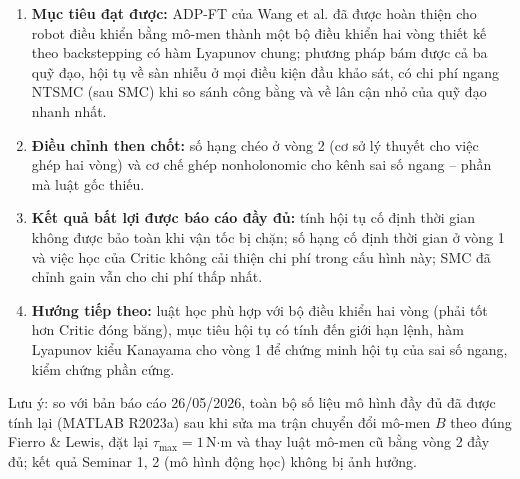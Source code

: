 \documentclass[12pt,a4paper]{article}
\begin{document}
\begin{enumerate}
    \item \textbf{Mục tiêu đạt được:} ADP-FT của Wang et al. đã được hoàn thiện cho robot điều khiển bằng mô-men thành một bộ điều khiển hai vòng thiết kế theo backstepping có hàm Lyapunov chung; phương pháp bám được cả ba quỹ đạo, hội tụ về sàn nhiễu ở mọi điều kiện đầu khảo sát, có chi phí ngang NTSMC (sau SMC) khi so sánh công bằng và về lân cận nhỏ của quỹ đạo nhanh nhất.
    \item \textbf{Điều chỉnh then chốt:} số hạng chéo ở vòng 2 (cơ sở lý thuyết cho việc ghép hai vòng) và cơ chế ghép nonholonomic cho kênh sai số ngang -- phần mà luật gốc thiếu.
    \item \textbf{Kết quả bất lợi được báo cáo đầy đủ:} tính hội tụ cố định thời gian không được bảo toàn khi vận tốc bị chặn; số hạng cố định thời gian ở vòng 1 và việc học của Critic không cải thiện chi phí trong cấu hình này; SMC đã chỉnh gain vẫn cho chi phí thấp nhất.
    \item \textbf{Hướng tiếp theo:} luật học phù hợp với bộ điều khiển hai vòng (phải tốt hơn Critic đóng băng), mục tiêu hội tụ có tính đến giới hạn lệnh, hàm Lyapunov kiểu Kanayama cho vòng 1 để chứng minh hội tụ của sai số ngang, kiểm chứng phần cứng.
\end{enumerate}

Lưu ý: so với bản báo cáo 26/05/2026, toàn bộ số liệu mô hình đầy đủ đã được tính lại (MATLAB R2023a) sau khi sửa ma trận chuyển đổi mô-men $B$ theo đúng Fierro \& Lewis, đặt lại $\tau_\text{max} = 1$\,N$\cdot$m và thay luật mô-men cũ bằng vòng 2 đầy đủ; kết quả Seminar 1, 2 (mô hình động học) không bị ảnh hưởng.

\end{document}
